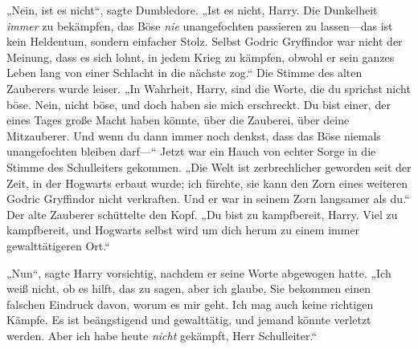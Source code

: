 „Nein, ist es nicht“, sagte Dumbledore. „Ist es nicht, Harry. Die Dunkelheit \emph{immer} zu bekämpfen, das Böse \emph{nie} unangefochten passieren zu lassen—das ist kein Heldentum, sondern einfacher Stolz. Selbst Godric Gryffindor war nicht der Meinung, dass es sich lohnt, in jedem Krieg zu kämpfen, obwohl er sein ganzes Leben lang von einer Schlacht in die nächste zog.“ Die Stimme des alten Zauberers wurde leiser. „In Wahrheit, Harry, sind die Worte, die du sprichst nicht böse. Nein, nicht böse, und doch haben sie mich erschreckt. Du bist einer, der eines Tages große Macht haben könnte, über die Zauberei, über deine Mitzauberer. Und wenn du dann immer noch denkst, dass das Böse niemals unangefochten bleiben darf—“ Jetzt war ein Hauch von echter Sorge in die Stimme des Schulleiters gekommen. „Die Welt ist zerbrechlicher geworden seit der Zeit, in der Hogwarts erbaut wurde; ich fürchte, sie kann den Zorn eines weiteren Godric Gryffindor nicht verkraften. Und er war in seinem Zorn langsamer als du.“ Der alte Zauberer schüttelte den Kopf. „Du bist zu kampfbereit, Harry. Viel zu kampfbereit, und Hogwarts selbst wird um dich herum zu einem immer gewalttätigeren Ort.“

„Nun“, sagte Harry vorsichtig, nachdem er seine Worte abgewogen hatte. „Ich weiß nicht, ob es hilft, das zu sagen, aber ich glaube, Sie bekommen einen falschen Eindruck davon, worum es mir geht. Ich mag auch keine richtigen Kämpfe. Es ist beängstigend und gewalttätig, und jemand könnte verletzt werden. Aber ich habe heute \emph{nicht} gekämpft, Herr Schulleiter.“

